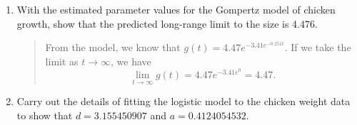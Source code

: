 \documentclass{hw}
\begin{document}
\begin{enumerate}
\item With the estimated parameter values for the Gompertz model of chicken growth, show that the predicted
long-range limit to the size is 4.476.
\begin{quote}
From the model, we know that $g(t) = 4.47e^{-3.41e^{-0.251t}}$. If we take the limit as $t\to\infty$, we
have
\[
\lim_{t\to\infty}g(t) = 4.47e^{-3.41e^{0}} = 4.47.
\]
\end{quote}

\item Carry out the details of fitting the logistic model to the chicken weight data to show that
$d = 3.155450907$ and $a = 0.4124054532$.
\begin{quote}

\end{quote}
\end{enumerate}
\end{document}
